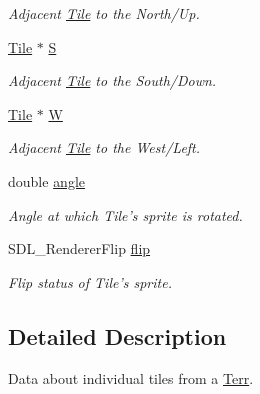 \begin{DoxyCompactItemize}
\begin{DoxyCompactList}\small\item\em Adjacent \hyperlink{class_tile}{Tile} to the North/\+Up. \end{DoxyCompactList}\item 
\hyperlink{class_tile}{Tile} $\ast$ \hyperlink{class_tile_adc655f39bc82d9b5898b991faea9df42}{S}\hypertarget{class_tile_adc655f39bc82d9b5898b991faea9df42}{}\label{class_tile_adc655f39bc82d9b5898b991faea9df42}

\begin{DoxyCompactList}\small\item\em Adjacent \hyperlink{class_tile}{Tile} to the South/\+Down. \end{DoxyCompactList}\item 
\hyperlink{class_tile}{Tile} $\ast$ \hyperlink{class_tile_ae992c1605ed059cb9eaff737b99824dc}{W}\hypertarget{class_tile_ae992c1605ed059cb9eaff737b99824dc}{}\label{class_tile_ae992c1605ed059cb9eaff737b99824dc}

\begin{DoxyCompactList}\small\item\em Adjacent \hyperlink{class_tile}{Tile} to the West/\+Left. \end{DoxyCompactList}\item 
double \hyperlink{class_tile_a33219999fbd38d9c9e8e98d09a9b65a5}{angle}\hypertarget{class_tile_a33219999fbd38d9c9e8e98d09a9b65a5}{}\label{class_tile_a33219999fbd38d9c9e8e98d09a9b65a5}

\begin{DoxyCompactList}\small\item\em Angle at which Tile’s sprite is rotated. \end{DoxyCompactList}\item 
S\+D\+L\+\_\+\+Renderer\+Flip \hyperlink{class_tile_a815af374aa83cd0be79bb5553056b15e}{flip}\hypertarget{class_tile_a815af374aa83cd0be79bb5553056b15e}{}\label{class_tile_a815af374aa83cd0be79bb5553056b15e}

\begin{DoxyCompactList}\small\item\em Flip status of Tile’s sprite. \end{DoxyCompactList}\end{DoxyCompactItemize}


\subsection{Detailed Description}
Data about individual tiles from a \hyperlink{class_terr}{Terr}. 

